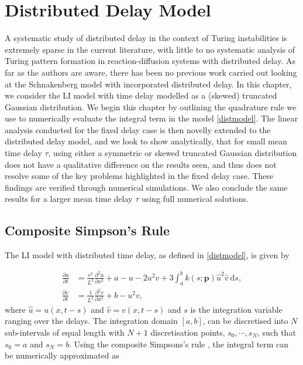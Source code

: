 \chapter{Distributed Delay Model}\label{section:distdel}
A systematic study of distributed delay in the context of Turing instabilities is extremely sparse in the current literature, with little to no systematic analysis of Turing pattern formation in reaction-diffusion systems with distributed delay. As far as the authors are aware, there has been no previous work carried out looking at the Schnakenberg model with incorporated distributed delay. In this chapter, we consider the LI model with time delay modelled as a (skewed) truncated Gaussian distribution. We begin this chapter by outlining the quadrature rule we use to numerically evaluate the integral term in the model \eqref{distmodel}. The linear analysis conducted for the fixed delay case is then novelly extended to the distributed delay model, and we look to show analytically, that for small mean time delay $\tau$, using either a symmetric or skewed truncated Gaussian distribution does not have a qualitative difference on the results seen, and thus does not resolve some of the key problems highlighted in the fixed delay case. These findings are verified through numerical simulations. We also conclude the same results for a larger mean time delay $\tau$ using full numerical solutions.
\section{Composite Simpson's Rule}\label{section:quad}

The LI model with distributed time delay, as defined in \eqref{distmodel}, is given by

\begin{equation}\label{distmodel2}
  \begin{split}
    \frac{\partial u}{\partial t}&=\frac{\epsilon^2}{L^2}\frac{\partial^2u}{\partial x^2}+a-u-2u^2v+3\int_{a}^{b}k(s;\textbf{p})\hat{u}^2\hat{v} \ \text{d}s,\\
    \frac{\partial v}{\partial t}&=\frac{1}{L^2}\frac{\partial^2v}{\partial x^2}+b-u^2v,
\end{split}
\end{equation}
where $\hat{u}=u(x,t-s)$ and $\hat{v}=v(x,t-s)$ and $s$ is the integration variable ranging over the delays. The integration domain $[a, b]$, can be discretised into $N$ sub-intervals of equal length with $N+1$ discretisation points, $s_0,\cdots,s_{N}$, such that $s_0=a$ and $s_N=b$. Using the composite Simpsons's rule \cite{compsimp}, the integral term can be numerically approximated as

